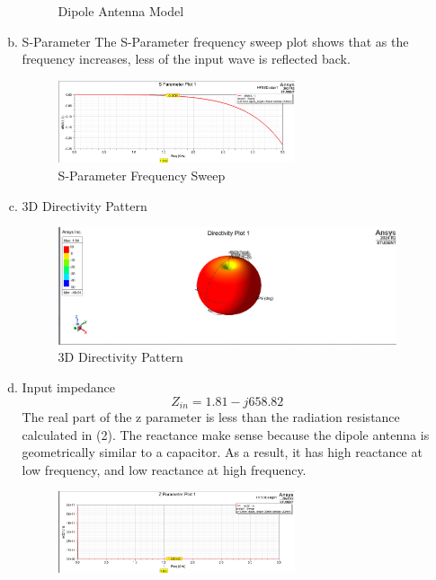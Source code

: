 \documentclass{article} %
\begin{document}
\begin{enumerate}
\begin{enumerate}[(a)]
\begin{figure}[H]
                        \caption{Dipole Antenna Model}
                    \end{figure}
              \item S-Parameter
                    The S-Parameter frequency sweep plot shows that as the frequency increases, less of the input wave is reflected back.
                    \begin{figure}[H]
                        \centering
                        \includegraphics[width=0.7\textwidth]{./image/figure3.png}
                        \caption{S-Parameter Frequency Sweep}
                    \end{figure}
              \item 3D Directivity Pattern
                    \begin{figure}[H]
                        \centering
                        \includegraphics[width=1\textwidth]{./image/figure8.png}
                        \caption{3D Directivity Pattern}
                    \end{figure}
              \item Input impedance
                    $$Z_{in} = 1.81 -j 658.82 $$
                    The real part of the z parameter is less than the radiation resistance calculated in (2). The reactance make sense because the dipole antenna is geometrically similar to a capacitor. As a result, it has high reactance at low frequency, and low reactance at high frequency.
                    \begin{figure}[H]
                        \centering
                        \includegraphics[width=0.7\textwidth]{./image/figure4.png}

\end{figure}
\end{enumerate}
\end{enumerate}
\end{document}
